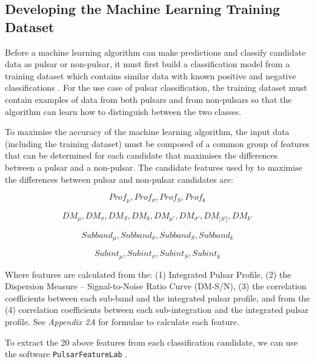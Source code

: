 \documentclass{article}
\begin{document}
\subsection{Developing the Machine Learning Training Dataset}

Before a machine learning algorithm can make predictions and classify candidate data as pulsar or non-pulsar, it must first build a classification model from a training dataset which contains similar data with known positive and negative classifications \autocite{tan, lyon}. For the use case of pulsar classification, the training dataset must contain examples of data from both pulsars and from non-pulsars so that the algorithm can learn how to distinguish between the two classes.

To maximise the accuracy of the machine learning algorithm, the input data (including the training dataset) must be composed of a common group of features that can be determined for each candidate that maximises the differences between a pulsar and a non-pulsar. The candidate features used by \smartcite{tan} to maximise the differences between pulsar and non-pulsar candidates are:

\begin{equation}
    Prof_{\mu}, Prof_{\sigma}, Prof_{S}, Prof_{k}
\end{equation}

\begin{equation}
    DM_{\mu}, DM_{\sigma}, DM_{S},DM_{k},
    DM_{\mu'}, DM_{\sigma'}, DM_{|S'|},DM_{k'}
\end{equation}

\begin{equation}
    Subband_{\mu}, Subband_{\sigma}, Subband_{S}, Subband_{k}
\end{equation}

\begin{equation}
    Subint_{\mu}, Subint_{\sigma}, Subint_{S}, Subint_{k}
\end{equation}

Where features are calculated from the: (1) Integrated Pulsar Profile, (2) the Dispersion Measure -- Signal-to-Noise Ratio Curve (DM-S/N), (3) the correlation coefficients between each sub-band and the integrated pulsar profile, and from the (4) correlation coefficients between each sub-integration and the integrated pulsar profile. See \emph{Appendix 2A} for formulae to calculate each feature.

To extract the 20 above features from each classification candidate, we can use the software 
\verb|PulsarFeatureLab| \autocite{lyon}.
\end{document}
